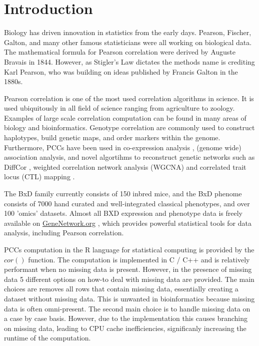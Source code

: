 \documentclass{bioinfo}
\begin{document}
\maketitle

\section{Introduction}
Biology has driven innovation in statistics from the early days. Pearson, Fischer, Galton, 
and many other famous statisticians were all working on biological data. The mathematical 
formula for Pearson correlation were derived by Auguste Bravais in 1844. However, as 
Stigler's Law \cite{Stigler1980} dictates the methods name is crediting Karl Pearson, who 
was building on ideas published by Francis Galton in the 1880s. 

Pearson correlation is one of the most used correlation algorithms in science. 
It is used ubiquitously in all field of science ranging from agriculture to 
zoology. Examples of large scale correlation computation can be found in many 
areas of biology and bioinformatics. Genotype correlation are commonly used to 
construct haplotypes, build genetic maps, and order markers within the genome. 
Furthermore, PCCs have been used in co-expression analysis \citep{Tesson:2010}, 
(genome wide) association analysis, and novel algortihms to reconstruct genetic 
networks such as DiffCor \citep{Fukushima:2013}, weighted correlation network 
analysis (WGCNA) \citep{Horvath:2008} and correlated trait locus (CTL) mapping 
\citep{Arends2016a}.

The BxD family currently consists of 150 inbred mice, and the BxD phenome consists 
of 7000 hand curated and well-integrated classical phenotypes, and over 100 'omics' 
datasets. Almost all BXD expression and phenotype data is freely available on 
\href{https://genenetwork.org/}{GeneNetwork.org} \citep{Sloan2016}, which provides 
powerful statistical tools for data analysis, including Pearson correlation.

PCCs computation in the R language for statistical computing \citep{R:2005} is 
provided by the $cor()$ function. The computation is implemented in C / C++ and 
is relatively performant when no missing data is present. However, 
in the presence of missing data 5 different options on how-to deal 
with missing data are provided. The main choices are removes all rows that 
contain missing data, essentially creating a dataset without missing data. This is 
unwanted in bioinformatics because missing data is often omni-present. 
The second main choice is to handle missing data on a case by case basis. However, 
due to the implementation this causes branching on missing data, leading to CPU 
cache inefficiencies, significanly increasing the runtime of the computation.
\end{document}
